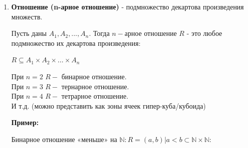 \documentclass{book}
\begin{document}
\begin{enumerate}[label=\arabic*., parsep=4pt, itemsep=4pt, topsep=4pt, partopsep=0pt]
\begin{enumerate}[label=\arabic*., parsep=4pt, itemsep=4pt, topsep=4pt, partopsep=0pt]
Иными словами, например, две ориентации (гипер-)куба отсылают нас к одному и тому же (гипер-)кубу по факту, если не учитывать при этом его `расцветки'.\\
Или другой пример: пара векторов $\{\overrightarrow{v_1}, \overrightarrow{v_2}\}$ может быть сложена из $(\overrightarrow{v_1}, \overrightarrow{v_2})$ и $(\overrightarrow{v_2}, \overrightarrow{v_1})$.

\end{enumerate}

\textbf{ПРИМЕРЫ ЧЕРЕЗ ЛИНЕЙНЫЕ И НЕЛИНЕЙНЫЕ КОМБИНАЦИИ}

\item \textbf{Отношение (n-арное отношение)} - подмножество декартова произведения множеств.

Пусть даны $A_1, A_2, ... , A_n$. Тогда $n-$арное отношение $R$ - это любое подмножество их декартова произведения:

$R \subseteq A_1 \times A_2 \times \ldots \times A_n$

При $n = 2$ $R -$ бинарное отношение.\\
При $n = 3$ $R -$ тернарное отношение.\\
При $n = 4$ $R -$ тетрарное отношение.\\
И т.д. (можно представить как зоны ячеек гипер-куба/кубоида)

\textbf{Пример:}

Бинарное отношение «меньше» на $\mathbb{N}: R = {(a,b) | a<b} \subset \mathbb{N} \times \mathbb{N}:$

\begin{figure}[H]
\centering
{}
\end{figure}
\end{enumerate}
\end{document}
